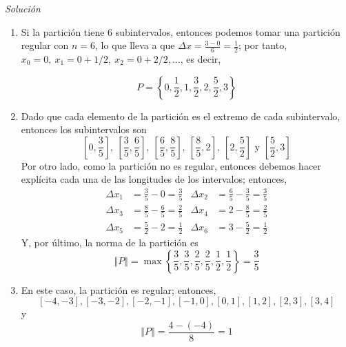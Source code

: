 \textit{Solución}
\begin{enumerate}[leftmargin=1.2em,   itemindent=0pt,       labelwidth=\labelwidth,
	labelsep=0.5em,]


\item Si la partición tiene $6$ subintervalos, entonces podemos tomar una partición regular con {\small $n=6$}, lo que lleva a que {\small $\Delta x=\frac{3-0}{6}=\frac{1}{2}$}; por tanto, {\small $x_0=0,\ x_1=0+1/2,\ x_2=0+2/2,\ldots$}, es decir,

{\small
\[
P=\left\{ 0,\frac{1}{2},1,\frac{3}{2},2,\frac{5}{2},3\right\}
\]
}
\item Dado que cada elemento de la partición es el extremo de cada subintervalo, entonces los subintervalos son
\[
\left[ 0,\frac{3}{5}\right],\ \left[ \frac{3}{5},\frac{6}{5}\right],\ \left[ \frac{6}{5},\frac{8}{5}\right],\ \left[ \frac{8}{5},2\right],\ \left[ 2,\frac{5}{2}\right]\text{ y } \left[ \frac{5}{2},3\right]
\]
Por otro lado, como la partición no es regular, entonces debemos hacer explícita cada una de las longitudes de los intervalos; entonces,
\begin{align*}
\Delta x_{1}&=\frac{3}{5}-0=\frac{3}{5} & \Delta x_{2}&=\frac{6}{5}-
\frac{3}{5}=\frac{3}{5}\\
\Delta x_{3}&=\frac{8}{5}-\frac{6}{5}=\frac{2}{5} &\Delta x_{4}&=2-\frac{8}{5}=\frac{2}{5}\\
\Delta x_{5}&=\frac{5}{2}-2=\frac{1}{2}& \Delta x_{6}&=3-\frac{5}{2}=\frac{1}{2}
\end{align*}
Y, por último, la norma de la partición es
\[
\left\Vert P\right\Vert=\max \left\{ \frac{3}{5},\frac{3}{5},\frac{2}{5},%
\frac{2}{5},\frac{1}{2},\frac{1}{2}\right\} =\frac{3}{5} 
\]

\item En este caso, la partición es regular; entonces,
\[
\left[ -4,-3\right] ,\left[ -3,-2\right] ,\left[ -2,-1\right] ,\left[ -1,0\right] ,\left[ 0,1\right] ,\left[ 1,2\right] ,\left[ 2,3\right] ,\left[ 3,4\right]
\]
y
\[
\left\Vert P\right\Vert =\frac{4-(-4)}{8}=1
\]


\end{enumerate}
